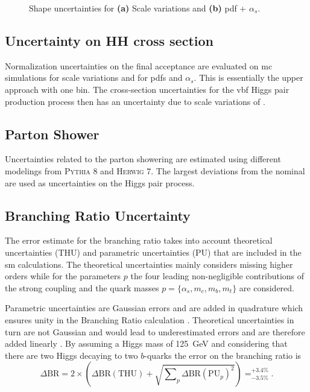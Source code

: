 \begin{figure}
    \centering
    \caption[]{Shape uncertainties for \textbf{(a)} Scale variations and \textbf{(b)} \ac{pdf} + $\alpha_s$.}
\end{figure}

\subsection{Uncertainty on HH cross section}
Normalization uncertainties on the final acceptance are evaluated on \ac{mc} simulations for scale variations and for \acp{pdf} and $\alpha_s$. This is essentially the upper approach with one bin. The cross-section uncertainties for the \ac{vbf} Higgs pair production process then has an uncertainty due to scale variations of \citep{de2016arxiv}. 

\subsection{Parton Shower}
Uncertainties related to the parton showering are estimated using different modelings from \textsc{Pythia 8} and \textsc{Herwig 7}. The largest deviations from the nominal are used as uncertainties on the Higgs pair process. 


\subsection{Branching Ratio Uncertainty}
The error estimate for the branching ratio takes into account theoretical uncertainties (THU) and parametric uncertainties (PU) that are included in the \ac{sm} calculations. The theoretical uncertainties mainly considers missing higher orders while for the parameters $p$ the four leading non-negligible contributions of the strong coupling and the quark masses $p=\{\alpha_s,m_c,m_b,m_t\}$ are considered.

Parametric uncertainties are Gaussian errors and are added in quadrature which ensures unity in the Branching Ratio calculation \citep{de2016arxiv}. Theoretical uncertainties in turn are not Gaussian and would lead to underestimated errors and are therefore added linearly \citep{de2016arxiv}. By assuming a Higgs mass of \qty[]{125}{GeV} and considering that there are two Higgs decaying to two $b$-quarks the error on the branching ratio is
\begin{equation}
    \Delta\text{BR} = 2 \times \left(\Delta\text{BR}(\text{THU}) + \sqrt{\sum\nolimits_{p} \Delta\text{BR}(\text{PU}_{p})^2 }\right) = _{-3.5\%}^{+3.4\%}.
\end{equation}

